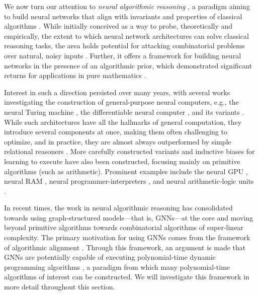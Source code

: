 \documentclass[twoside,11pt]{article}
\newcommand{\cm}[1]{{{\textcolor{orange}{\textbf{[CM:} {#1}\textbf{]}}}}}
\begin{document}

We now turn our attention to \emph{neural algorithmic reasoning} \citep{velivckovic2021neural}, a paradigm aiming to build neural networks that align with invariants and properties of classical algorithms \citep{cormen2009introduction}. While initially conceived as a way to probe, theoretically and empirically, the extent to which neural network architectures can solve classical reasoning tasks, the area holds potential for attacking combinatorial problems over natural, noisy inputs \citep{Deac2020}. Further, it offers a framework for building neural networks in the presence of an algorithmic prior, which demonstrated significant returns for applications in pure mathematics \citep{davies2021advancing,blundell2021towards}.

Interest in such a direction persisted over many years, with several works investigating the construction of general-purpose neural computers, e.g., the neural Turing machine \citep{Graves2014}, the differentiable neural computer \citep{Graves2016}, and its variants \citep{csordas2018improving}. While such architectures have all the hallmarks of general computation, they introduce several components at once, making them often challenging to optimize, and in practice, they are almost always outperformed by simple relational reasoners \citep{Santoro2017,Santoro2018}. More carefully constructed variants and inductive biases for learning to execute \citep{Zaremba2014} have also been constructed, focusing mainly on primitive algorithms (such as arithmetic). Prominent examples include the neural GPU \citep{Kaiser2015}, neural RAM \citep{Kurach2015}, neural programmer-interpreters \citep{Reed2015}, and neural arithmetic-logic units \citep{Trask2018,Madsen2020}.

In recent times, the work in neural algorithmic reasoning has consolidated towards using graph-structured models---that is, GNNs---at the core and moving beyond primitive algorithms towards combinatorial algorithms of super-linear complexity. The primary motivation for using GNNs comes from the framework of algorithmic alignment \citep{Xu2019a,dudzik2022graph}. Through this framework, an argument is made that GNNs are potentially capable of executing polynomial-time dynamic programming algorithms \citep{bellman1966dynamic}, a paradigm from which many polynomial-time algorithms of interest can be constructed. We will investigate this framework in more detail throughout this section. 
\end{document}
